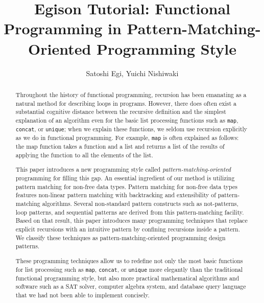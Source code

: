 \documentclass{article}
\begin{document}
\title{Egison Tutorial: Functional Programming in Pattern-Matching-Oriented Programming Style}

\author{Satoshi Egi, Yuichi Nishiwaki}

\maketitle

\begin{abstract}
  Throughout the history of functional programming, recursion has been emanating as a natural method for describing loops in programs.
  However, there does often exist a substantial cognitive distance between the recursive definition and the simplest explanation of an algorithm even for the basic list processing functions such as \texttt{map}, \texttt{concat}, or \texttt{unique}; when we explain these functions, we seldom use recursion explicitly as we do in functional programming.
  For example, \texttt{map} is often explained as follows: the map function takes a function and a list and returns a list of the results of applying the function to all the elements of the list.
  
  This paper introduces a new programming style called \emph{pattern-matching-oriented} programming for filling this gap.
  An essential ingredient of our method is utilizing pattern matching for non-free data types.
  Pattern matching for non-free data types features non-linear pattern matching with backtracking and extensibility of pattern-matching algorithms.
  Several non-standard pattern constructs such as not-patterns, loop patterns, and sequential patterns are derived from this pattern-matching facility.
  Based on that result, this paper introduces many programming techniques that replace explicit recursions with an intuitive pattern by confining recursions inside a pattern.
  We classify these techniques as pattern-matching-oriented programming design patterns.
  
  These programming techniques allow us to redefine not only the most basic functions for list processing such as \texttt{map}, \texttt{concat}, or \texttt{unique} more elegantly than the traditional functional programming style, but also more practical mathematical algorithms and software such as a SAT solver, computer algebra system, and database query language that we had not been able to implement concisely.
\end{abstract}
\end{document}
